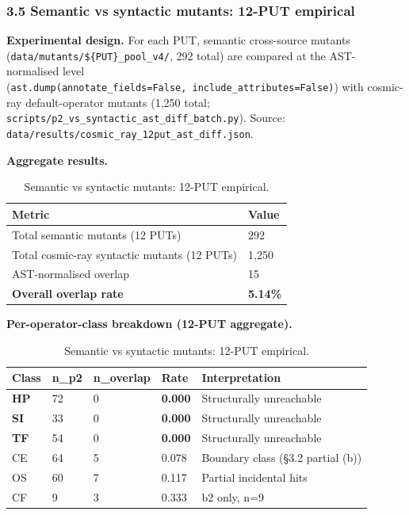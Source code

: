 \documentclass[review,12pt,authoryear]{elsarticle}
\begin{document}
\subsubsection{3.5 Semantic vs syntactic mutants: 12-PUT empirical}\label{p2-vs-syntactic-mutants-12-put-empirical-layer-3}

\textbf{Experimental design.} For each PUT, semantic cross-source mutants
(\texttt{data/mutants/\$\{PUT\}\_pool\_v4/}, 292 total) are compared at
the AST-normalised level
(\texttt{ast.dump(annotate\_fields=False,\ include\_attributes=False)})
with cosmic-ray default-operator mutants (1,250 total;
\texttt{scripts/p2\_vs\_syntactic\_ast\_diff\_batch.py}). Source:
\texttt{data/results/cosmic\_ray\_12put\_ast\_diff.json}.

\textbf{Aggregate results.}

{\def\LTcaptype{table} %
\begin{longtable}[]{@{}ll@{}}
\caption{Semantic vs syntactic mutants: 12-PUT empirical.}\label{tab:p2-04}\\
\toprule\noalign{}
Metric & Value \\
\midrule\noalign{}
\endfirsthead
\endhead
\bottomrule\noalign{}
\endlastfoot
Total semantic mutants (12 PUTs) & 292 \\
Total cosmic-ray syntactic mutants (12 PUTs) & 1,250 \\
AST-normalised overlap & 15 \\
\textbf{Overall overlap rate} & \textbf{5.14\%} \\
\end{longtable}
}

\textbf{Per-operator-class breakdown (12-PUT aggregate).}

{\def\LTcaptype{table} %
\begin{longtable}[]{@{}lllll@{}}
\caption{Semantic vs syntactic mutants: 12-PUT empirical.}\label{tab:p2-05}\\
\toprule\noalign{}
Class & n\_p2 & n\_overlap & Rate & Interpretation \\
\midrule\noalign{}
\endfirsthead
\endhead
\bottomrule\noalign{}
\endlastfoot
\textbf{HP} & 72 & 0 & \textbf{0.000} & Structurally unreachable \\
\textbf{SI} & 33 & 0 & \textbf{0.000} & Structurally unreachable \\
\textbf{TF} & 54 & 0 & \textbf{0.000} & Structurally unreachable \\
CE & 64 & 5 & 0.078 & Boundary class (§3.2 partial (b)) \\
OS & 60 & 7 & 0.117 & Partial incidental hits \\
CF & 9 & 3 & 0.333 & b2 only, n=9 \\
\end{longtable}
}
\end{document}
